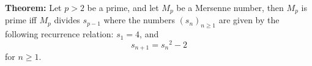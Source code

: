 \documentclass[12pt]{article}
\begin{document}
\textbf{Theorem:} Let $p>2$ be a prime, and let $M_p$ be a Mersenne number, then $M_p$ is prime iff $M_p$ divides $s_{p-1}$ where the numbers $(s_n)_{n\geq1}$ are given by the following recurrence relation: $s_1=4$, and $$s_{n+1}={s_n}^2-2$$ for $n\geq1$.
\end{document}
